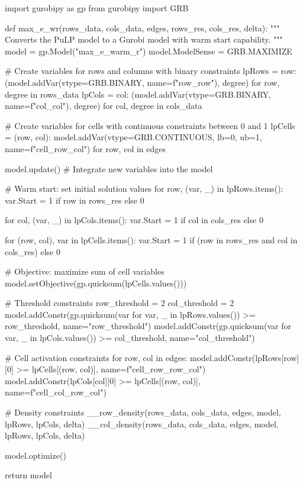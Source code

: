 import gurobipy as gp
from gurobipy import GRB

def max_e_wr(rows_data, cols_data, edges, rows_res, cols_res, delta):
    """
    Converts the PuLP model to a Gurobi model with warm start capability.
    """
    model = gp.Model("max_e_warm_r")
    model.ModelSense = GRB.MAXIMIZE

    # Create variables for rows and columns with binary constraints
    lpRows = {row: (model.addVar(vtype=GRB.BINARY, name=f"row_{row}"), degree) for row, degree in rows_data}
    lpCols = {col: (model.addVar(vtype=GRB.BINARY, name=f"col_{col}"), degree) for col, degree in cols_data}

    # Create variables for cells with continuous constraints between 0 and 1
    lpCells = {(row, col): model.addVar(vtype=GRB.CONTINUOUS, lb=0, ub=1, name=f"cell_{row}_{col}") 
               for row, col in edges}

    model.update()  # Integrate new variables into the model

    # Warm start: set initial solution values
    for row, (var, _) in lpRows.items():
        var.Start = 1 if row in rows_res else 0

    for col, (var, _) in lpCols.items():
        var.Start = 1 if col in cols_res else 0

    for (row, col), var in lpCells.items():
        var.Start = 1 if (row in rows_res and col in cols_res) else 0

    # Objective: maximize sum of cell variables
    model.setObjective(gp.quicksum(lpCells.values()))

    # Threshold constraints
    row_threshold = 2
    col_threshold = 2
    model.addConstr(gp.quicksum(var for var, _ in lpRows.values()) >= row_threshold, name="row_threshold")
    model.addConstr(gp.quicksum(var for var, _ in lpCols.values()) >= col_threshold, name="col_threshold")

    # Cell activation constraints
    for row, col in edges:
        model.addConstr(lpRows[row][0] >= lpCells[(row, col)], name=f"cell_row_{row}_{col}")
        model.addConstr(lpCols[col][0] >= lpCells[(row, col)], name=f"cell_col_{row}_{col}")

    # Density constraints
    __row_density(rows_data, cols_data, edges, model, lpRows, lpCols, delta)
    __col_density(rows_data, cols_data, edges, model, lpRows, lpCols, delta)

    model.optimize()

    return model

